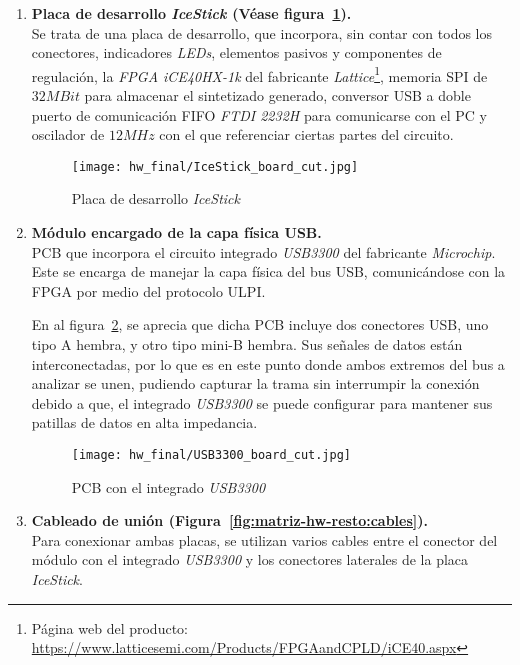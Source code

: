 \begin{enumerate}
    \item \textbf{Placa de desarrollo \emph{IceStick \cite{icestickmanual}} (Véase figura~\ref{fig:IceStick_board}).} \\
    Se trata de una placa de desarrollo, que incorpora, sin contar con todos los conectores, indicadores \emph{LEDs}, elementos pasivos y componentes de regulación, la \emph{FPGA iCE40HX-1k\cite{lattice:ice40}} del fabricante \emph{Lattice}\footnote{Página web del producto: \url{https://www.latticesemi.com/Products/FPGAandCPLD/iCE40.aspx}}, memoria SPI de $32MBit$ para almacenar el sintetizado generado, conversor USB a doble puerto de comunicación FIFO \emph{FTDI 2232H\cite{FTDI:FT2232HL}} para comunicarse con el PC y oscilador de $12MHz$ con el que referenciar ciertas partes del circuito.
    
    \begin{figure}[htbp]
        \centering
        \texttt{[image: hw\_final/IceStick\_board\_cut.jpg]}
        \caption{Placa de desarrollo \emph{IceStick}}
        \label{fig:IceStick_board}
    \end{figure}

    \item \textbf{Módulo encargado de la capa física USB.} \\
    PCB que incorpora el circuito integrado \emph{USB3300\cite{icestickmanual}} del fabricante \emph{Microchip}. Este se encarga de manejar la capa física del bus USB, comunicándose con la FPGA por medio del protocolo ULPI\cite{ulpi-specs}.

    En al figura~\ref{fig:USB3300_board}, se aprecia que dicha PCB incluye dos conectores USB, uno tipo A hembra, y otro tipo mini-B hembra. Sus señales de datos están interconectadas, por lo que es en este punto donde ambos extremos del bus a analizar se unen, pudiendo capturar la trama sin interrumpir la conexión debido a que, el integrado \emph{USB3300} se puede configurar para mantener sus patillas de datos en alta impedancia.

    \begin{figure}[htbp]
        \centering
        \texttt{[image: hw\_final/USB3300\_board\_cut.jpg]}
        \caption{PCB con el integrado \emph{USB3300}}
        \label{fig:USB3300_board}
    \end{figure}

    \item \textbf{Cableado de unión (Figura~\ref{fig:matriz-hw-resto:cables}).} \\
    Para conexionar ambas placas, se utilizan varios cables entre el conector del módulo con el integrado \emph{USB3300} y los conectores laterales de la placa \emph{IceStick}.


\end{enumerate}
